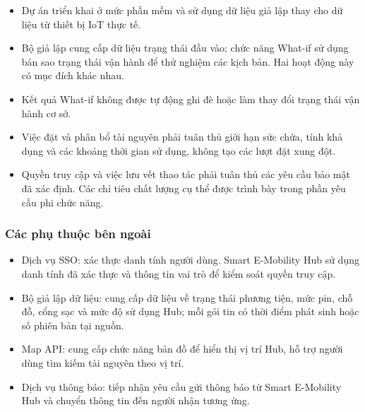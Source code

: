 \begin{itemize}

\item Dự án triển khai ở mức phần mềm và sử dụng dữ liệu giả lập thay cho dữ liệu từ thiết bị IoT thực tế.

\item Bộ giả lập cung cấp dữ liệu trạng thái đầu vào; chức năng What-if sử dụng bản sao trạng thái vận hành để thử nghiệm các kịch bản. Hai hoạt động này có mục đích khác nhau.

\item Kết quả What-if không được tự động ghi đè hoặc làm thay đổi trạng thái vận hành cơ sở.

\item Việc đặt và phân bổ tài nguyên phải tuân thủ giới hạn sức chứa, tính khả dụng và các khoảng thời gian sử dụng, không tạo các lượt đặt xung đột.

\item Quyền truy cập và việc lưu vết thao tác phải tuân thủ các yêu cầu bảo mật đã xác định. Các chỉ tiêu chất lượng cụ thể được trình bày trong phần yêu cầu phi chức năng.

\end{itemize}

\subsubsection{Các phụ thuộc bên ngoài}

\begin{itemize}

\item Dịch vụ SSO: xác thực danh tính người dùng. Smart E-Mobility Hub sử dụng danh tính đã xác thực và thông tin vai trò để kiểm soát quyền truy cập.

\item Bộ giả lập dữ liệu: cung cấp dữ liệu về trạng thái phương tiện, mức pin, chỗ đỗ, cổng sạc và mức độ sử dụng Hub; mỗi gói tin có thời điểm phát sinh hoặc số phiên bản tại nguồn.

\item Map API: cung cấp chức năng bản đồ để hiển thị vị trí Hub, hỗ trợ người dùng tìm kiếm tài nguyên theo vị trí.

\item Dịch vụ thông báo: tiếp nhận yêu cầu gửi thông báo từ Smart E-Mobility Hub và chuyển thông tin đến người nhận tương ứng.

\end{itemize}


